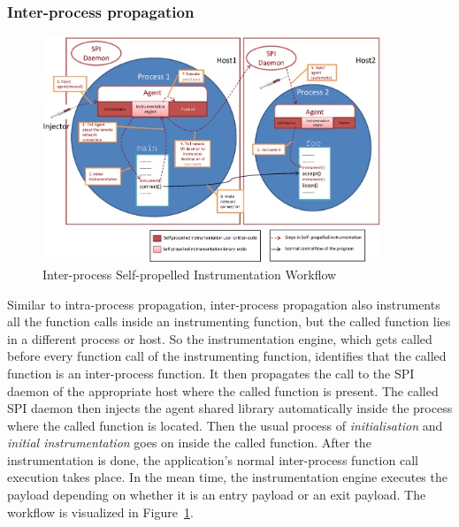 \subsubsection{Inter-process propagation}
\begin{figure}[ht]
  \centering
  \includegraphics[width=0.90\textwidth]{figure/interprocess.eps}
  \caption{Inter-process Self-propelled Instrumentation Workflow}
  \label{fig:Inter-process Self-propelled Instrumentation}
\end{figure}

Similar to intra-process propagation, inter-process propagation also
instruments all the function calls inside an instrumenting function, but the
called function lies in a different process or host. So the instrumentation
engine, which gets called before every function call of the instrumenting
function, identifies that the called function is an inter-process function. It
then propagates the call to the SPI daemon of the appropriate host where
the called function is present.
The called SPI daemon then injects the agent shared library automatically
inside the process where the called function is located. Then the usual
process of \textit{initialisation} and \textit{initial instrumentation} goes
on inside the called function. After the instrumentation is done, the
application's normal inter-process function call execution takes place. In
the mean time, the instrumentation engine executes the payload depending on
whether it is an entry payload or an exit payload. The workflow is visualized
in Figure~\ref{fig:Inter-process Self-propelled Instrumentation}.




